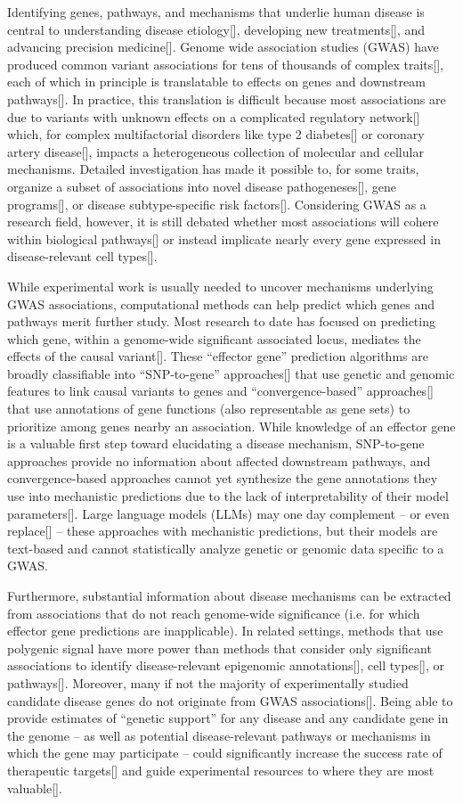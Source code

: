 \documentclass[sn-nature]{sn-jnl}%
\theoremstyle{thmstyleone}%
\theoremstyle{thmstyletwo}%
\theoremstyle{thmstylethree}%
\begin{document}
Identifying genes, pathways, and mechanisms that underlie human disease is central to understanding disease etiology[], developing new treatments[], and advancing precision medicine[]. Genome wide association studies (GWAS) have produced common variant associations for tens of thousands of complex traits[], each of which in principle is translatable to effects on genes and downstream pathways[]. In practice, this translation is difficult because most associations are due to variants with unknown effects on a complicated regulatory network[] which, for complex multifactorial disorders like type 2 diabetes[] or coronary artery disease[], impacts a heterogeneous collection of molecular and cellular mechanisms. Detailed investigation has made it possible to, for some traits, organize a subset of associations into novel disease pathogeneses[], gene programs[], or disease subtype-specific risk factors[]. Considering GWAS as a research field, however, it is still debated whether most associations will cohere within biological pathways[] or instead implicate nearly every gene expressed in disease-relevant cell types[]. 

While experimental work is usually needed to uncover mechanisms underlying GWAS associations, computational methods can help predict which genes and pathways merit further study. Most research to date has focused on predicting which gene, within a genome-wide significant associated locus, mediates the effects of the causal variant[]. These “effector gene” prediction algorithms are broadly classifiable into “SNP-to-gene” approaches[] that use genetic and genomic features to link causal variants to genes and “convergence-based” approaches[] that use annotations of gene functions (also representable as gene sets) to prioritize among genes nearby an association. While knowledge of an effector gene is a valuable first step toward elucidating a disease mechanism, SNP-to-gene approaches provide no information about affected downstream pathways, and convergence-based approaches cannot yet synthesize the gene annotations they use into mechanistic predictions due to the lack of interpretability of their model parameters[]. Large language models (LLMs) may one day complement – or even replace[] – these approaches with mechanistic predictions, but their models are text-based and cannot statistically analyze genetic or genomic data specific to a GWAS.

Furthermore, substantial information about disease mechanisms can be extracted from associations that do not reach genome-wide significance (i.e. for which effector gene predictions are inapplicable). In related settings, methods that use polygenic signal have more power than methods that consider only significant associations to identify disease-relevant epigenomic annotations[], cell types[], or pathways[]. Moreover, many if not the majority of experimentally studied candidate disease genes do not originate from GWAS associations[]. Being able to provide estimates of “genetic support” for any disease and any candidate gene in the genome – as well as potential disease-relevant pathways or mechanisms in which the gene may participate – could significantly increase the success rate of therapeutic targets[] and guide experimental resources to where they are most valuable[].
\end{document}
